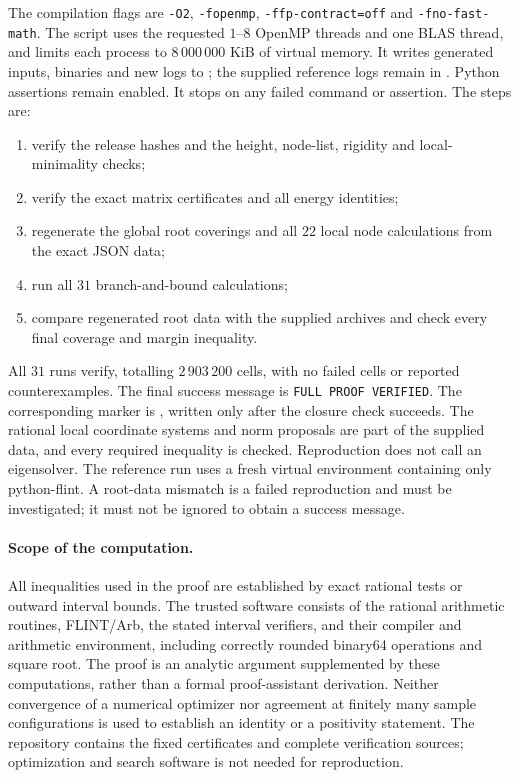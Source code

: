 \documentclass[11pt]{article}
\theoremstyle{definition}
\begin{document}
The compilation flags are \texttt{-O2}, \texttt{-fopenmp}, \texttt{-ffp-contract=off} and \texttt{-fno-fast-math}.
The script uses the requested $1$--$8$ OpenMP threads
and one BLAS thread, and limits each process to $8\,000\,000$ KiB of virtual memory.
It writes generated inputs, binaries and new logs to ; the supplied reference logs remain
in . Python assertions remain enabled.
It stops on any failed command or assertion. The steps are:
\begin{enumerate}
\item verify the release hashes and the height, node-list, rigidity and local-minimality checks;
\item verify the exact matrix certificates and all energy identities;
\item regenerate the global root coverings and all $22$ local node calculations from the exact JSON data;
\item run all $31$ branch-and-bound calculations;
\item compare regenerated root data with the supplied archives and check every final coverage and margin inequality.
\end{enumerate}
All $31$ runs verify, totalling $2\,903\,200$ cells, with no failed cells or reported counterexamples.
The final success message is \texttt{FULL PROOF VERIFIED}. The corresponding marker is
, written only after the closure check succeeds.
The rational local coordinate systems and norm proposals are part of the supplied data, and every required
inequality is checked. Reproduction does not call an eigensolver. The reference run uses a fresh virtual environment
containing only python-flint. A root-data mismatch is a failed reproduction and must be investigated;
it must not be ignored to obtain a success message.

\paragraph{Scope of the computation.}
All inequalities used in the proof are established by exact rational tests or outward interval bounds.
The trusted software consists of the rational arithmetic routines, FLINT/Arb, the stated interval verifiers, and their
compiler and arithmetic environment, including correctly rounded binary64 operations and square root.
The proof is an analytic argument supplemented by these computations, rather than a formal proof-assistant derivation.
Neither convergence of a numerical optimizer nor agreement at finitely many sample configurations is used to establish
an identity or a positivity statement. The repository contains the fixed certificates and complete verification
sources; optimization and search software is not needed for reproduction.
\end{document}

